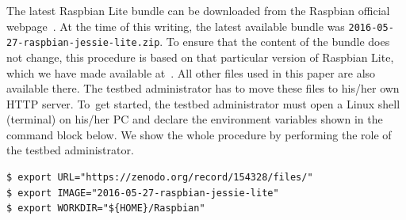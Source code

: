 \documentclass[electronics,article,accept,moreauthors,pdftex,10pt,a4paper]{mdpi}
\theoremstyle{mdpi}
\newcounter{ex}
\newcounter{re}
\theoremstyle{mdpidefinition}
\begin{document}

The latest Raspbian Lite bundle can be downloaded from the Raspbian
official webpage~\cite{raspbian}. At the time of this writing, the latest
available bundle was \texttt{2016-05-27-raspbian-jessie-lite.zip}.
To ensure that the content of the bundle does not change, this procedure
is based on that particular version of Raspbian Lite, which we have
made available at~\cite{soerensen_chres_wiant_2016_154143}. All other files used in this paper are also available there. The testbed
administrator has to move these files to his/her own HTTP server.
To~get started, the testbed administrator must open a Linux
shell (terminal) on his/her PC and declare the environment variables shown
in the command block below. We show the whole procedure by performing the role
of the testbed administrator.



\begin{lstlisting}[]
$ export URL="https://zenodo.org/record/154328/files/"
$ export IMAGE="2016-05-27-raspbian-jessie-lite"
$ export WORKDIR="${HOME}/Raspbian"
\end{lstlisting}
\FloatBarrier
\vspace{-5mm}
\end{document}
